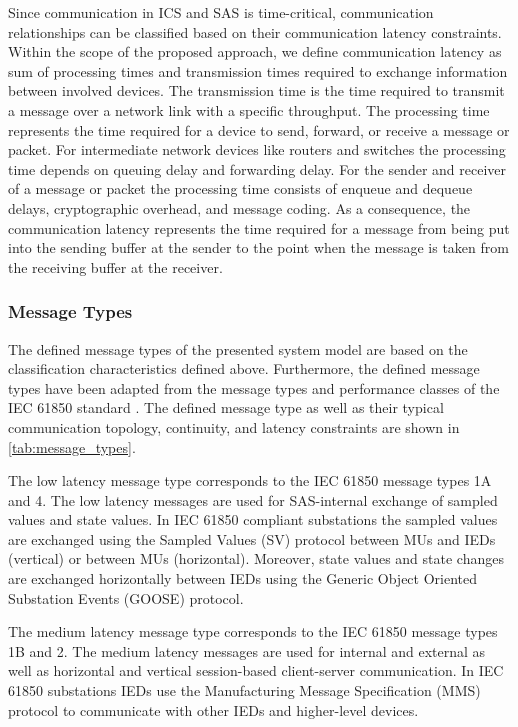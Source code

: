 Since communication in ICS and SAS is time-critical, communication relationships can be classified based on their communication latency constraints.
Within the scope of the proposed approach, we define communication latency as sum of processing times and transmission times required to exchange information between involved devices.
The transmission time is the time required to transmit a message over a network link with a specific throughput.
The processing time represents the time required for a device to send, forward, or receive a message or packet.
For intermediate network devices like routers and switches the processing time depends on queuing delay and forwarding delay.
For the sender and receiver of a message or packet the processing time consists of enqueue and dequeue delays, cryptographic overhead, and message coding.
As a consequence, the communication latency represents the time required for a message from being put into the sending buffer at the sender to the point when the message is taken from the receiving buffer at the receiver.

\subsubsection{Message Types}
\label{sec:approach:system_model:communication:message_types}
The defined message types of the presented system model are based on the classification characteristics defined above.
Furthermore, the defined message types have been adapted from the message types and performance classes of the IEC 61850 standard \cite{IEC61850P5}.
The defined message type as well as their typical communication topology, continuity, and latency constraints are shown in \autoref{tab:message_types}.

The low latency message type corresponds to the IEC 61850 \cite{IEC61850P5} message types 1A and 4.
The low latency messages are used for SAS-internal exchange of sampled values and state values.
In IEC 61850 compliant substations the sampled values are exchanged using the Sampled Values (SV) protocol between MUs and IEDs (vertical) or between MUs (horizontal).
Moreover, state values and state changes are exchanged horizontally between IEDs using the Generic Object Oriented Substation Events (GOOSE) protocol.

The medium latency message type corresponds to the IEC 61850 message types 1B and 2.
The medium latency messages are used for internal and external as well as horizontal and vertical session-based client-server communication.
In IEC 61850 substations IEDs use the Manufacturing Message Specification (MMS) protocol to communicate with other IEDs and higher-level devices.

